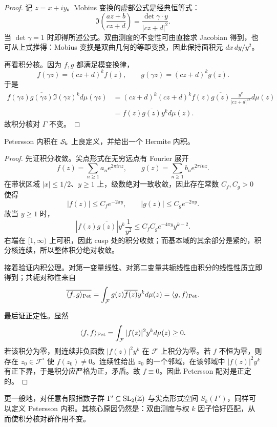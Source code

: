 \begin{proof}
记 $z=x+iy$。Mobius 变换的虚部公式是经典恒等式：
\[
\Im\!\left(\frac{az+b}{cz+d}\right)=\frac{\det\gamma\cdot y}{|cz+d|^2}.
\]
当 $\det\gamma=1$ 时即得所述公式。双曲测度的不变性可由直接求 Jacobian 得到，也可从上式推得：Mobius 变换是双曲几何的等距变换，因此保持面积元 $dx\,dy/y^2$。

再看积分核。因为 $f,g$ 都满足模变换律，
\[
f(\gamma z)=(cz+d)^k f(z),\qquad g(\gamma z)=(cz+d)^k g(z).
\]
于是
\begin{align*}
f(\gamma z)\overline{g(\gamma z)}\Im(\gamma z)^k d\mu(\gamma z)
&=(cz+d)^k\overline{(cz+d)^k}f(z)\overline{g(z)}\frac{y^k}{|cz+d|^{2k}}d\mu(z)\\
&=f(z)\overline{g(z)}y^k d\mu(z).
\end{align*}
故积分核对 $\Gamma$ 不变。
\end{proof}

\begin{theorem}
Petersson 内积在 $\mathcal{S}_k$ 上良定义，并给出一个 Hermite 内积。
\end{theorem}

\begin{proof}
先证积分收敛。尖点形式在无穷远点有 Fourier 展开
\[
f(z)=\sum_{n\ge 1} a_n e^{2\pi i nz},\qquad g(z)=\sum_{n\ge 1} b_n e^{2\pi i nz}.
\]
在带状区域 $|x|\le 1/2$、$y\ge 1$ 上，级数绝对一致收敛，因此存在常数 $C_f,C_g>0$ 使得
\[
|f(z)|\le C_f e^{-2\pi y},\qquad |g(z)|\le C_g e^{-2\pi y}.
\]
故当 $y\ge 1$ 时，
\[
|f(z)\overline{g(z)}|y^k\frac{1}{y^2}
\le C_fC_g e^{-4\pi y}y^{k-2}.
\]
右端在 $[1,\infty)$ 上可积，因此 cusp 处的积分收敛；而基本域的其余部分是紧的，积分核连续，所以整体积分绝对收敛。

接着验证内积公理。对第一变量线性、对第二变量共轭线性由积分的线性性质立即得到；共轭对称性来自
\[
\overline{\langle f, g \rangle_{\mathrm{Pet}}}=\int_{\mathcal{F}} g(z)\overline{f(z)}y^k d\mu(z)=\langle g, f \rangle_{\mathrm{Pet}}.
\]

最后证正定性。显然
\[
\langle f, f \rangle_{\mathrm{Pet}}=\int_{\mathcal{F}} |f(z)|^2 y^k d\mu(z)\ge 0.
\]
若该积分为零，则连续非负函数 $|f(z)|^2 y^k$ 在 $\mathcal{F}$ 上积分为零。若 $f$ 不恒为零，则存在 $z_0\in\mathcal{F}^{\circ}$ 使 $f(z_0)\ne 0$。连续性给出 $z_0$ 的一个邻域，在该邻域中 $|f(z)|^2 y^k$ 有正下界，于是积分应严格为正，矛盾。故 $f\equiv 0$。因此 Petersson 配对是正定的。
\end{proof}

\begin{remark}
更一般地，对任意有限指数子群 $\Gamma'\subseteq \mathrm{SL}_2(\mathbb{Z})$ 与尖点形式空间 $S_k(\Gamma')$，同样可以定义 Petersson 内积。其核心原因仍然是：双曲测度与权 $k$ 因子恰好匹配，从而使积分核对群作用不变。
\end{remark}

